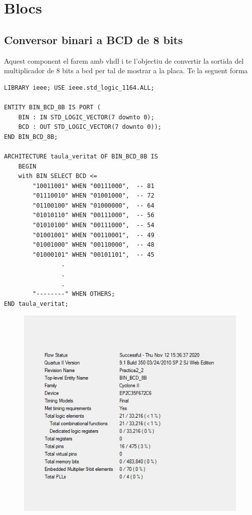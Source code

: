 \documentclass[12pt, a4papre]{article}
\begin{document}
	\newpage
	\section{Blocs}
	
	\subsection{Conversor binari a BCD de 8 bits}
	
	Aquest component el farem amb vhdl i te l'objectiu de convertir la sortida del multiplicador de 8 bits a bcd per tal de mostrar a la placa. Te la seguent forma
	\begin{lstlisting}[style=vhdl, frame=single, basicstyle=\tiny]
LIBRARY ieee; USE ieee.std_logic_1164.ALL;  

ENTITY BIN_BCD_8B IS PORT (   
	BIN : IN STD_LOGIC_VECTOR(7 downto 0);   
	BCD : OUT STD_LOGIC_VECTOR(7 downto 0)); 
END BIN_BCD_8B;  

ARCHITECTURE taula_veritat OF BIN_BCD_8B IS   
	BEGIN 
	with BIN SELECT BCD <=     	
		"10011001" WHEN "00111000",  -- 81     
		"01110010" WHEN "01001000",  -- 72      
		"01100100" WHEN "01000000",  -- 64     
		"01010110" WHEN "00111000",  -- 56     
		"01010100" WHEN "00111000",  -- 54        
		"01001001" WHEN "00110001",  -- 49     
		"01001000" WHEN "00110000",  -- 48     
		"01000101" WHEN "00101101",  -- 45     
				.
				.
				. 
		"--------" WHEN OTHERS;   
END taula_veritat;
\end{lstlisting}

\begin{figure}[H]
		\begin{center}
		\includegraphics[width=130mm]{informeBIN_BCD_8B.jpeg}
		\end{center}
	\end{figure}
\end{document}
